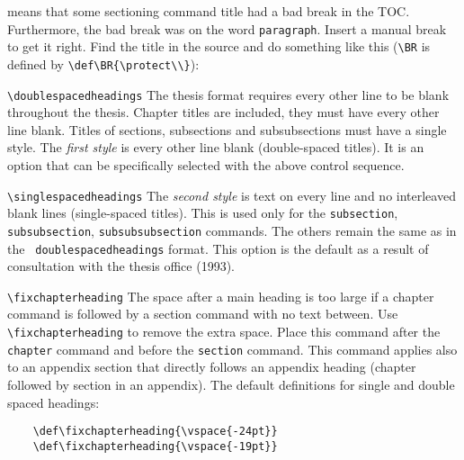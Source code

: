 \begin{description}

means that some sectioning command title had a bad break in the TOC.
Furthermore, the bad break was on the word {\tt paragraph}.
Insert a manual break to get it right. Find the title in the source and
do something like this (\verb"\BR" is defined by
\verb"\def\BR{\protect\\}"):


\item \verb|\doublespacedheadings|
The thesis format requires every other line to be blank throughout the
thesis. Chapter titles are included, they must have every other line
blank. Titles of sections, subsections and subsubsections must have a
single style.
The {\em first style}
is every other line blank (double-spaced titles). It is an option that
can be specifically selected with the above control sequence.

\item \verb|\singlespacedheadings|
The {\em second style} is text on every line and no
interleaved blank lines (single-spaced titles). This is used only for
the {\tt subsection}, {\tt subsubsection}, {\tt subsubsubsection}
commands. The others remain the same as in the {\tt
doublespacedheadings} format. This option is the default as a result of
consultation with the thesis office (1993).

\item \verb|\fixchapterheading|
The space after a main heading is too large if a chapter command
is followed by a section command with no text between. Use
\verb"\fixchapterheading" to remove the extra space. Place this command
after the {\tt chapter} command and before the {\tt section} command.
This command applies also to an appendix section that directly follows
an appendix heading (chapter followed by section in an appendix).
The default definitions for single and double spaced headings:

\verb|    \def\fixchapterheading{\vspace{-24pt}}|\\
\verb|    \def\fixchapterheading{\vspace{-19pt}}|

\end{description}


